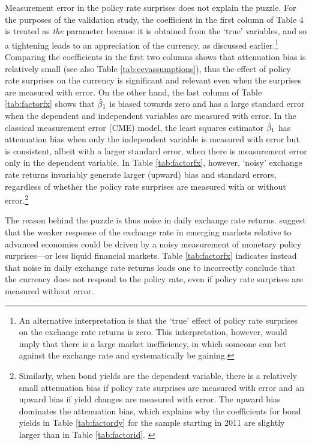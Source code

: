 Measurement error in the policy rate surprises does not explain the puzzle. For the purposes of the validation study, the coefficient in the first column of Table 4 is treated as \textit{the} parameter because it is obtained from the `true' variables, and so a tightening leads to an appreciation of the currency, as discussed earlier.\footnote{An alternative interpretation is that the `true’ effect of policy rate surprises on the exchange rate returns is zero. This interpretation, however, would imply that there is a large market inefficiency, in which someone can bet against the exchange rate and systematically be gaining.} Comparing the coefficients in the first two columns shows that attenuation bias is relatively small (see also Table \ref{tab:cevassumptions}), thus the effect of policy rate surprises on the currency is significant and relevant even when the surprises are measured with error. On the other hand, the last column of Table \ref{tab:factorfx} shows that \(\hat{\beta}_{1}\) is biased towards zero and has a large standard error when the dependent and independent variables are measured with error. In the classical measurement error (CME) model, the least squares estimator \(\hat{\beta}_{1}\) has attenuation bias when only the independent variable is measured with error but is consistent, albeit with a larger standard error, when there is measurement error only in the dependent variable. In Table \ref{tab:factorfx}, however, `noisy' exchange rate returns invariably generate larger (upward) bias and standard errors, regardless of whether the policy rate surprises are measured with or without error.\footnote{Similarly, when bond yields are the dependent variable, there is a relatively small attenuation bias if policy rate surprises are measured with error and an upward bias if yield changes are measured with error. The upward bias dominates the attenuation bias, which explains why the coefficients for bond yields in Table \ref{tab:factordy} for the sample starting in 2011 are slightly larger than in Table \ref{tab:factorid}. \label{fn:factoryc}} 

The reason behind the puzzle is thus noise in daily exchange rate returns. \textcite{PenningsRamayandiTang:2015} suggest that the weaker response of the exchange rate in emerging markets relative to advanced economies could be driven by a noisy measurement of monetary policy surprises---or less liquid financial markets. Table \ref{tab:factorfx} indicates instead that noise in daily exchange rate returns leads one to incorrectly conclude that the currency does not respond to the policy rate, even if policy rate surprises are measured without error. 

